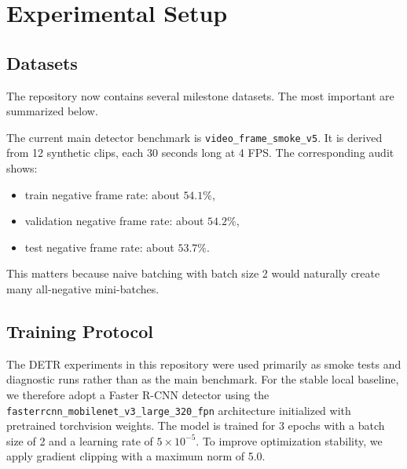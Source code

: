 \documentclass[11pt]{article}
\begin{document}
\section{Experimental Setup}
\subsection{Datasets}
The repository now contains several milestone datasets. The most important are summarized below.

\begin{table}[H]
    \centering
    \caption{Key local synthetic datasets used in the current project stage.}
\end{table}

The current main detector benchmark is \texttt{video\_frame\_smoke\_v5}. It is derived from 12 synthetic clips, each 30 seconds long at 4 FPS. The corresponding audit shows:
\begin{itemize}[leftmargin=1.5em]
    \item train negative frame rate: about $54.1\%$,
    \item validation negative frame rate: about $54.2\%$,
    \item test negative frame rate: about $53.7\%$.
\end{itemize}
This matters because naive batching with batch size 2 would naturally create many all-negative mini-batches.

\subsection{Training Protocol}

The DETR experiments in this repository were used primarily as smoke tests and diagnostic runs rather than as the main benchmark. For the stable local baseline, we therefore adopt a Faster R-CNN detector using the \texttt{fasterrcnn\_mobilenet\_v3\_large\_320\_fpn} architecture initialized with pretrained torchvision weights. The model is trained for 3 epochs with a batch size of 2 and a learning rate of $5 \times 10^{-5}$. To improve optimization stability, we apply gradient clipping with a maximum norm of 5.0.
\end{document}
